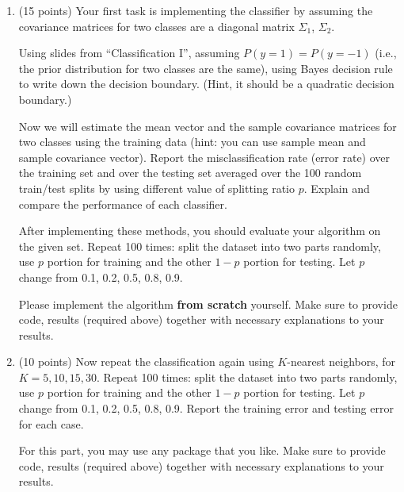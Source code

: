 \documentclass[a4paper,12pt,fleqn]{article}
\begin{document}
\begin{enumerate}
\item (15 points)
Your first task is implementing the classifier by assuming the covariance matrices for two classes are a diagonal matrix $\Sigma_1$, $\Sigma_ 2$. 

Using slides from ``Classification I'', assuming $P(y=1) = P(y=-1)$ (i.e., the prior distribution for two classes are the same), using Bayes decision rule to write down the decision boundary. (Hint, it should be a quadratic decision boundary.)

Now we will estimate the mean vector and the sample covariance matrices for two classes using the training data (hint: you can use sample mean and sample covariance vector). Report the misclassification rate (error rate) over the training set and over the testing set averaged over the 100 random train/test splits by using different value of splitting ratio $p$. Explain and compare the performance of each classifier.

After implementing these methods, you should evaluate your algorithm on the given set. Repeat 100 times: split the dataset into two parts randomly, use $p$ portion for training and the other $1 - p$ portion for testing. Let $p$ change from 0.1, 0.2, 0.5, 0.8, 0.9.

Please implement the algorithm {\bf from scratch} yourself. Make sure to provide code, results (required above) together with necessary explanations to your results. 

\item (10 points) Now repeat the classification again using $K$-nearest neighbors, for $K = 5, 10, 15, 30$.  Repeat 100 times: split the dataset into two parts randomly, use $p$ portion for training and the other $1 - p$ portion for testing. Let $p$ change from 0.1, 0.2, 0.5, 0.8, 0.9. Report the training error and testing error for each case.

For this part, you may use any package that you like.  Make sure to provide code, results (required above) together with necessary explanations to your results. 

\end{enumerate}


\label{finalpage}
\end{document}
